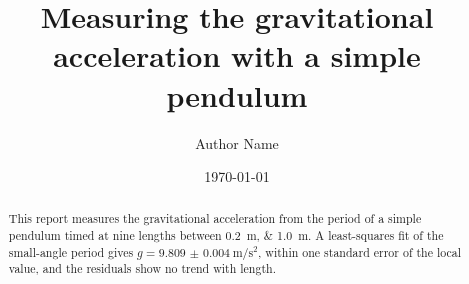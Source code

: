 \documentclass[11pt]{report}
\title{Measuring the gravitational acceleration with a simple pendulum}
\author{Author Name}
\date{\today}
\begin{document}
\maketitle

\begin{abstract}
This report measures the gravitational acceleration from the period of a simple pendulum timed at nine lengths between \qtylist{0.2;1.0}{\metre}. A least-squares fit of the small-angle period gives $g = \qty{9.809(4)}{\metre\per\second\squared}$, within one standard error of the local value, and the residuals show no trend with length.
\end{abstract}

\tableofcontents








\end{document}
